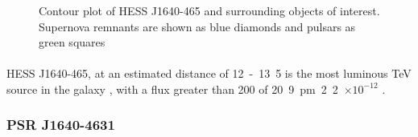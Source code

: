 \documentclass[a4paper, titlepage, oneside]{article}
\newcommand{\e}[1]{\ensuremath{\times 10^{#1}}}
\newcommand{\parsec}{\mathrm{pc}}
\newcommand{\photon}{\mathrm{ph}}
\begin{document}
\begin{multicols}{2}
\begin{figure}[H]
  \centering
  \caption{Contour plot of HESS J1640-465 and surrounding objects of interest. Supernova remnants are shown as blue diamonds and pulsars as green squares}
  \label{fig:hess40}
\end{figure}

\paragraph{}
HESS J1640-465, at an estimated distance of \unit{12-13.5}{\kilo\parsec} is the most luminous TeV source in the galaxy \parencite{Gotthelf:2014}, with a flux greater than \unit{200}{\giga\electronvolt} of \unit{20.9\pm2.2\e{-12}}{\photon\usk\centi\metre\rpsquared\usk\reciprocal\second} \parencite{Aharonian:2006}.

\subsubsection{PSR J1640-4631}

\end{multicols}
\end{document}
